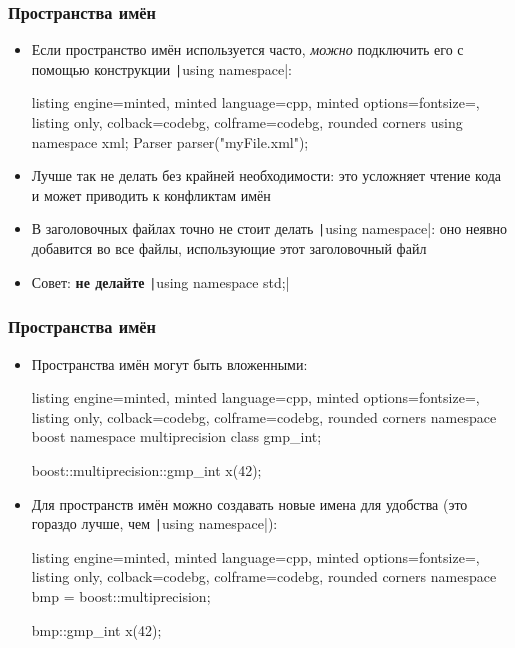 \documentclass[10pt]{beamer}
\begin{document}
\begin{frame}[fragile]
\frametitle{Пространства имён}
\begin{itemize}
\item Если пространство имён используется часто, \textit{можно} подключить его с помощью конструкции \texttt|using namespace|:
\begin{tcblisting}{listing engine=minted, minted language=cpp, minted options={fontsize=\scriptsize}, listing only, colback=codebg, colframe=codebg, rounded corners}
using namespace xml;
Parser parser("myFile.xml");
\end{tcblisting}
\pause
{}
\item Лучше так не делать без крайней необходимости: это усложняет чтение кода и может приводить к конфликтам имён
\pause
\item В заголовочных файлах точно не стоит делать \texttt|using namespace|: оно неявно добавится во все файлы, использующие этот заголовочный файл
\pause
\item Совет: \textbf{не делайте} \texttt|using namespace std;|
\end{itemize}
\end{frame}

\begin{frame}[fragile]
\frametitle{Пространства имён}
\begin{itemize}
\item Пространства имён могут быть вложенными:
\begin{tcblisting}{listing engine=minted, minted language=cpp, minted options={fontsize=\scriptsize}, listing only, colback=codebg, colframe=codebg, rounded corners}
namespace boost {
  namespace multiprecision {
    class gmp_int;
  }
}

boost::multiprecision::gmp_int x(42);
\end{tcblisting}
\pause
{}
\item Для пространств имён можно создавать новые имена для удобства (это гораздо лучше, чем \texttt|using namespace|):
\begin{tcblisting}{listing engine=minted, minted language=cpp, minted options={fontsize=\scriptsize}, listing only, colback=codebg, colframe=codebg, rounded corners}
namespace bmp = boost::multiprecision;

bmp::gmp_int x(42);
\end{tcblisting}
\end{itemize}
\end{frame}
\end{document}
